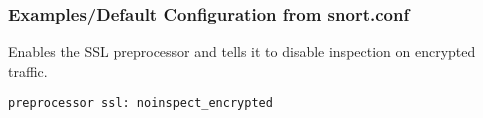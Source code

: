 \documentclass[english]{report}
\newcounter{slistnum}
\newenvironment{slist}
{ \begin{list}{ {\bf \arabic{slistnum}.} }{\usecounter{slistnum} } }
{ \end{list} }
\begin{document}
\subsubsection{Examples/Default Configuration from snort.conf}

Enables the SSL preprocessor and tells it to disable inspection on encrypted 
traffic.

\begin{verbatim}
preprocessor ssl: noinspect_encrypted
\end{verbatim}


%
%
%
%
%
%
%
%
%
%
%
%
%
%
%
%
%
\end{document}
